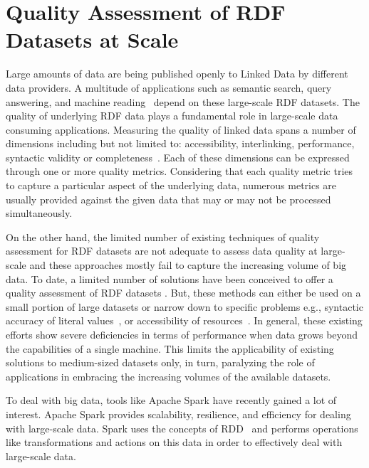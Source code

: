 \chapter{Quality Assessment of RDF Datasets at Scale}
\label{chapter:dist_quality_assessment}
Large amounts of data are being published openly to Linked Data by different data providers. 
A multitude of applications such as semantic search, query answering, and machine reading~\cite{rw2014} depend on these large-scale \gls{RDF} datasets.  
The quality of underlying \gls{RDF} data plays a fundamental role in large-scale data consuming applications. 
Measuring the quality of linked data spans a number of dimensions including but not limited to: accessibility, interlinking, performance, syntactic validity or completeness~\cite{zaveri2015quality}.
Each of these dimensions can be expressed through one or more quality metrics. 
Considering that each quality metric tries to capture a particular aspect of the underlying data, numerous metrics are usually provided against the given data that may or may not be processed simultaneously.

On the other hand, the limited number of existing techniques of quality assessment for \gls{RDF} datasets are not adequate to assess data quality at large-scale and these approaches mostly fail to capture the increasing volume of big data. 
To date, a limited number of solutions have been conceived to offer a quality assessment of \gls{RDF} datasets \cite{Debattista0AC18,farber2018,beek2018,debattista2016luzzu}.
But, these methods can either be used on a small portion of large datasets \cite{farber2018} or narrow down to specific problems e.g., syntactic accuracy of literal values~\cite{beek2018}, or accessibility of resources~\cite{Mihindukulasooriya2016LDSA}.
In general, these existing efforts show severe deficiencies in terms of performance when data grows beyond the capabilities of a single machine.
This limits the applicability of existing solutions to medium-sized datasets only, in turn, paralyzing the role of applications in embracing the increasing volumes of the available datasets.

To deal with big data, tools like Apache Spark have recently gained a lot of interest. 
Apache Spark provides scalability, resilience, and efficiency for dealing with large-scale data. 
Spark uses the concepts of \gls{RDD}~\cite{zaharia2012resilient} and performs operations like transformations and actions on this data in order to effectively deal with large-scale data. 

